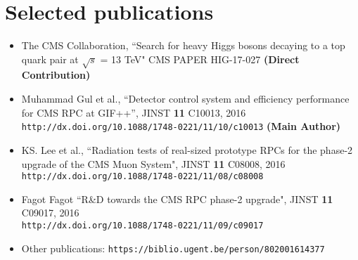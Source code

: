 \documentclass[a4paper,10pt]{article}
\begin{document}
\section{Selected publications}
\begin{itemize}
\item The CMS Collaboration, ``Search for heavy Higgs bosons decaying to a top quark pair at $\sqrt{s}$  = 13 TeV"  CMS PAPER HIG-17-027 \textbf{(Direct Contribution)}
\item Muhammad Gul et al., ``Detector control system and efficiency performance for CMS RPC at GIF++”, JINST \textbf{11} C10013, 2016 \\
\texttt{http://dx.doi.org/10.1088/1748-0221/11/10/c10013}  \textbf{(Main Author)}
\item KS. Lee et al., ``Radiation tests of real-sized prototype RPCs for the phase-2 upgrade of the CMS Muon System", JINST \textbf{11} C08008, 2016 \\
\texttt{http://dx.doi.org/10.1088/1748-0221/11/08/c08008}
\item Fagot Fagot ``R\&D towards the CMS RPC phase-2 upgrade", JINST \textbf{11} C09017, 2016\\ \texttt{http://dx.doi.org/10.1088/1748-0221/11/09/c09017}
\item Other publications:
\texttt{https://biblio.ugent.be/person/802001614377}

\end{itemize}


\end{document}
